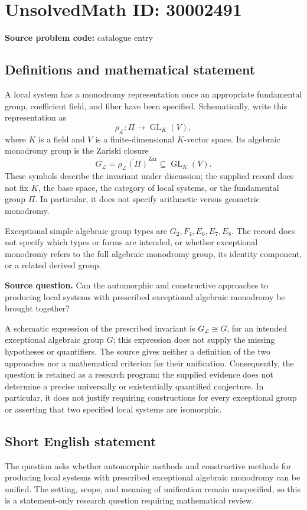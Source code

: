 \documentclass[11pt]{article}
\begin{document}
\section*{UnsolvedMath ID: 30002491}
\textbf{Source problem code:} catalogue entry
\subsection{Definitions and mathematical statement}
A local system has a monodromy representation once an appropriate fundamental group, coefficient field, and fiber have been specified. Schematically, write this representation as
\[
\rho_{\mathcal L}\colon \Pi\longrightarrow \operatorname{GL}_K(V),
\]
where \(K\) is a field and \(V\) is a finite-dimensional \(K\)-vector space. Its algebraic monodromy group is the Zariski closure
\[
G_{\mathcal L}=\overline{\rho_{\mathcal L}(\Pi)}^{\mathrm{Zar}}\subseteq\operatorname{GL}_K(V).
\]
These symbols describe the invariant under discussion; the supplied record does not fix \(K\), the base space, the category of local systems, or the fundamental group \(\Pi\). In particular, it does not specify arithmetic versus geometric monodromy.

Exceptional simple algebraic group types are \(G_2,F_4,E_6,E_7,E_8\). The record does not specify which types or forms are intended, or whether exceptional monodromy refers to the full algebraic monodromy group, its identity component, or a related derived group.

\textbf{Source question.} Can the automorphic and constructive approaches to producing local systems with prescribed exceptional algebraic monodromy be brought together?

A schematic expression of the prescribed invariant is \(G_{\mathcal L}\cong G\), for an intended exceptional algebraic group \(G\); this expression does not supply the missing hypotheses or quantifiers. The source gives neither a definition of the two approaches nor a mathematical criterion for their unification. Consequently, the question is retained as a research program: the supplied evidence does not determine a precise universally or existentially quantified conjecture. In particular, it does not justify requiring constructions for every exceptional group or asserting that two specified local systems are isomorphic.
\subsection{Short English statement}
The question asks whether automorphic methods and constructive methods for producing local systems with prescribed exceptional algebraic monodromy can be unified. The setting, scope, and meaning of unification remain unspecified, so this is a statement-only research question requiring mathematical review.
\end{document}
